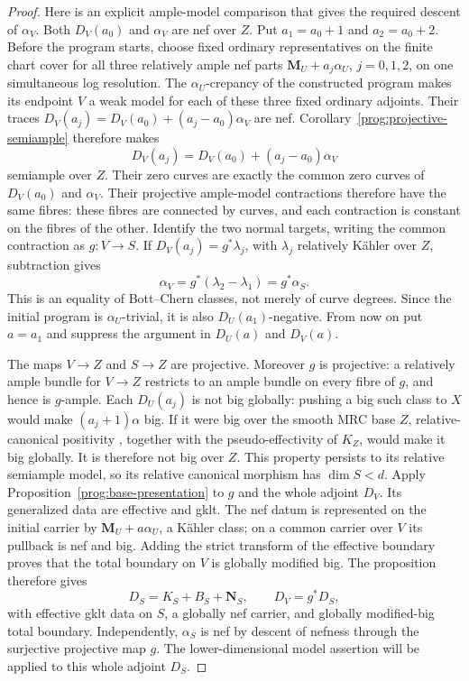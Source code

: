 \begin{proof}
Here is an explicit ample-model comparison that gives the required
descent of $\alpha_V$. Both $D_V(a_0)$ and $\alpha_V$ are nef over
$Z$. Put $a_1=a_0+1$ and $a_2=a_0+2$. Before the program starts,
choose fixed ordinary representatives on the finite chart cover for
all three relatively ample nef parts $\mathbf M_U+a_j\alpha_U$,
$j=0,1,2$, on one simultaneous log resolution. The
$\alpha_U$-crepancy of the constructed program makes its endpoint
$V$ a weak model for each of these three fixed ordinary adjoints.
Their traces $D_V(a_j)=D_V(a_0)+(a_j-a_0)\alpha_V$ are nef.
Corollary~\ref{prog:projective-semiample} therefore makes
\[
 D_V(a_j)=D_V(a_0)+(a_j-a_0)\alpha_V
\]
semiample over $Z$. Their zero curves are exactly the common zero
curves of $D_V(a_0)$ and $\alpha_V$. Their projective ample-model
contractions therefore have the same fibres: these fibres are
connected by curves, and each contraction is constant on the
fibres of the other. Identify the two normal targets, writing the
common contraction as $g:V\to S$. If
$D_V(a_j)=g^*\lambda_j$, with $\lambda_j$ relatively K\"ahler over
$Z$, subtraction gives
\[
 \alpha_V=g^*(\lambda_2-\lambda_1)=g^*\alpha_S.
\]
This is an equality of Bott--Chern classes, not merely of curve
degrees. Since the initial program is $\alpha_U$-trivial, it is
also $D_U(a_1)$-negative. From now on put $a=a_1$ and suppress
the argument in $D_U(a)$ and $D_V(a)$.

The maps $V\to Z$ and $S\to Z$ are projective. Moreover $g$ is
projective: a relatively ample bundle for $V\to Z$ restricts to
an ample bundle on every fibre of $g$, and hence is $g$-ample.
Each $D_U(a_j)$ is not big globally: pushing a big such class to
$X$ would make $(a_j+1)\alpha$ big. If it were big over the smooth
MRC base $Z$, relative-canonical positivity
\cite[Theorem~2.48]{HX}, together with the pseudo-effectivity of
$K_Z$, would make it big globally. It is therefore not big over
$Z$. This property persists to its relative semiample model, so
its relative canonical morphism has $\dim S<d$.
Apply Proposition~\ref{prog:base-presentation} to $g$ and the
whole adjoint $D_V$. Its generalized data are effective and gklt.
The nef datum is represented on the initial carrier by
$\mathbf M_U+a\alpha_U$, a K\"ahler class; on a common carrier over
$V$ its pullback is nef and big. Adding the strict transform of the
effective boundary proves that the total boundary on $V$ is globally
modified big. The proposition therefore gives
\[
 D_S=K_S+B_S+\mathbf N_S,\qquad D_V=g^*D_S,
\]
with effective gklt data on $S$, a globally nef carrier, and globally
modified-big total boundary. Independently, $\alpha_S$ is nef by
descent of nefness through the surjective projective map $g$.
The lower-dimensional model assertion will be applied to this whole
adjoint $D_S$.


\end{proof}
